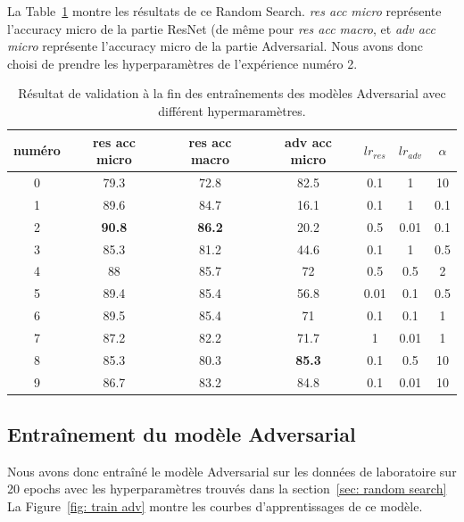 \documentclass[a4paper]{article}
\begin{document}
La Table~\ref{tab:random search results} montre les résultats de ce Random Search. \textit{res acc micro} représente l'accuracy micro de la partie ResNet (de même pour \textit{res acc macro}, et \textit{adv acc micro} représente l'accuracy micro de la partie Adversarial. Nous avons donc choisi de prendre les hyperparamètres de l'expérience numéro 2.

\begin{table}[ht]
    \centering
    \begin{tabular}{ccccccc}
    \toprule
    numéro & res acc micro & res acc macro & adv acc micro & $lr_{res}$ & $lr_{adv}$ & $\alpha$ \\
    \midrule
    0 & 79.3 & 72.8 & 82.5 & 0.1 & 1 & 10 \\
    1 & 89.6 & 84.7 & 16.1 & 0.1 & 1 & 0.1 \\
    2 & \textbf{90.8} & \textbf{86.2} & 20.2 & 0.5 & 0.01 & 0.1 \\
    3 & 85.3 & 81.2 & 44.6 & 0.1 & 1 & 0.5 \\
    4 & 88 & 85.7 & 72 & 0.5 & 0.5 & 2 \\
    5 & 89.4 & 85.4 & 56.8 & 0.01 & 0.1 & 0.5 \\
    6 & 89.5 & 85.4 & 71 & 0.1 & 0.1 & 1 \\
    7 & 87.2 & 82.2 & 71.7 & 1 & 0.01 & 1 \\
    8 & 85.3 & 80.3 & \textbf{85.3} & 0.1 & 0.5 & 10 \\
    9 & 86.7 & 83.2 & 84.8 & 0.1 & 0.01 & 10 \\
    \bottomrule
    \end{tabular}
    \caption{Résultat de validation à la fin des entraînements des modèles Adversarial avec différent hypermaramètres.}
    \label{tab:random search results}
\end{table}

\subsection{Entraînement du modèle Adversarial}
Nous avons donc entraîné le modèle Adversarial sur les données de laboratoire sur 20 epochs avec les hyperparamètres trouvés dans la section~\ref{sec: random search} La Figure~\ref{fig: train adv} montre les courbes d'apprentissages de ce modèle.
\end{document}
